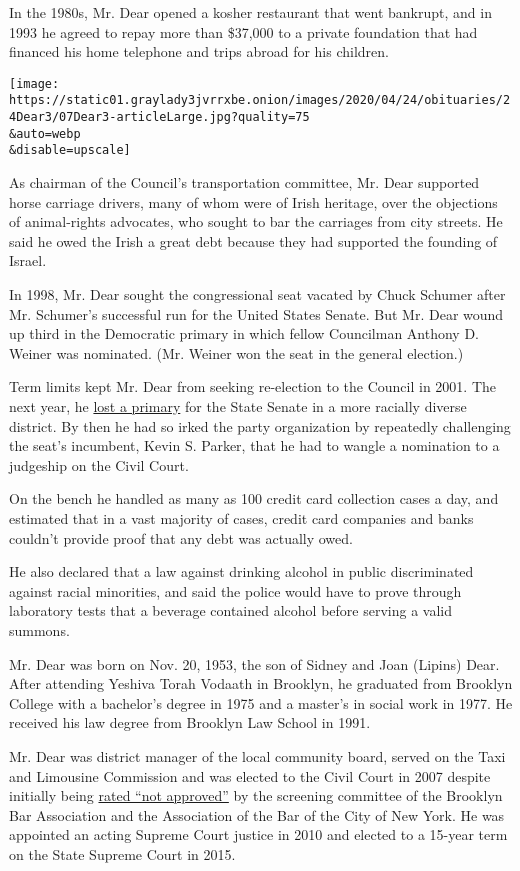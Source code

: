 In the 1980s, Mr. Dear opened a kosher restaurant that went bankrupt,
and in 1993 he agreed to repay more than \$37,000 to a private
foundation that had financed his home telephone and trips abroad for his
children.

\texttt{[image: https://static01.graylady3jvrrxbe.onion/images/2020/04/24/obituaries/24Dear3/07Dear3-articleLarge.jpg?quality=75\\\&auto=webp\\\&disable=upscale]}

As chairman of the Council's transportation committee, Mr. Dear
supported horse carriage drivers, many of whom were of Irish heritage,
over the objections of animal-rights advocates, who sought to bar the
carriages from city streets. He said he owed the Irish a great debt
because they had supported the founding of Israel.

In 1998, Mr. Dear sought the congressional seat vacated by Chuck Schumer
after Mr. Schumer's successful run for the United States Senate. But Mr.
Dear wound up third in the Democratic primary in which fellow Councilman
Anthony D. Weiner was nominated. (Mr. Weiner won the seat in the general
election.)

Term limits kept Mr. Dear from seeking re-election to the Council in
2001. The next year, he
\href{https://www.nytimes3xbfgragh.onion/2002/08/22/nyregion/four-way-race-in-brooklyn-for-a-redrawn-senate-district.html}{lost
a primary} for the State Senate in a more racially diverse district. By
then he had so irked the party organization by repeatedly challenging
the seat's incumbent, Kevin S. Parker, that he had to wangle a
nomination to a judgeship on the Civil Court.

On the bench he handled as many as 100 credit card collection cases a
day, and estimated that in a vast majority of cases, credit card
companies and banks couldn't provide proof that any debt was actually
owed.

He also declared that a law against drinking alcohol in public
discriminated against racial minorities, and said the police would have
to prove through laboratory tests that a beverage contained alcohol
before serving a valid summons.

Mr. Dear was born on Nov. 20, 1953, the son of Sidney and Joan (Lipins)
Dear. After attending Yeshiva Torah Vodaath in Brooklyn, he graduated
from Brooklyn College with a bachelor's degree in 1975 and a master's in
social work in 1977. He received his law degree from Brooklyn Law School
in 1991.

Mr. Dear was district manager of the local community board, served on
the Taxi and Limousine Commission and was elected to the Civil Court in
2007 despite initially being
\href{https://cityroom.blogs.nytimes3xbfgragh.onion/2007/09/20/not-approved-but-noach-dear-is-victorious/}{rated
``not approved''} by the screening committee of the Brooklyn Bar
Association and the Association of the Bar of the City of New York. He
was appointed an acting Supreme Court justice in 2010 and elected to a
15-year term on the State Supreme Court in 2015.

